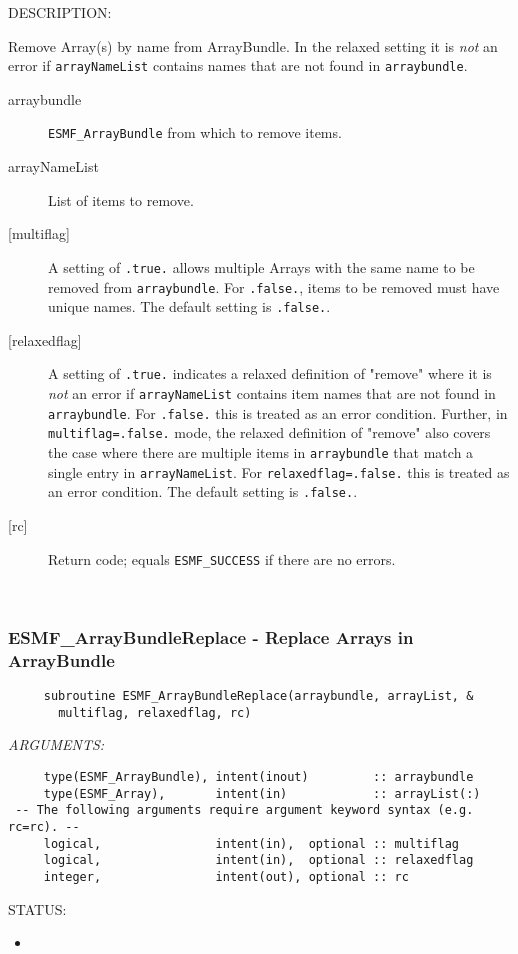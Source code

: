 {\sf DESCRIPTION:\\ }


     Remove Array(s) by name from ArrayBundle. In the relaxed setting it is 
     {\em not} an error if {\tt arrayNameList} contains names that are not 
     found in {\tt arraybundle}.
  
     \begin{description}
     \item [arraybundle]
       {\tt ESMF\_ArrayBundle} from which to remove items.
     \item [arrayNameList]
       List of items to remove.
     \item [{[multiflag]}]
       A setting of {\tt .true.} allows multiple Arrays with the same name
       to be removed from {\tt arraybundle}. For {\tt .false.}, items to be
       removed must have unique names. The default setting is {\tt .false.}.
     \item [{[relaxedflag]}]
       A setting of {\tt .true.} indicates a relaxed definition of "remove"
       where it is {\em not} an error if {\tt arrayNameList} contains item
       names that are not found in {\tt arraybundle}. For {\tt .false.} this is 
       treated as an error condition. 
       Further, in {\tt multiflag=.false.} mode, the relaxed definition of
       "remove" also covers the case where there are multiple items in
       {\tt arraybundle} that match a single entry in {\tt arrayNameList}.
       For {\tt relaxedflag=.false.} this is treated as an error condition.
       The default setting is {\tt .false.}.
     \item [{[rc]}]
       Return code; equals {\tt ESMF\_SUCCESS} if there are no errors.
     \end{description}
   
 
\mbox{}\hrulefill\ 
 
\subsubsection [ESMF\_ArrayBundleReplace] {ESMF\_ArrayBundleReplace - Replace Arrays in ArrayBundle}


  
\begin{verbatim}     subroutine ESMF_ArrayBundleReplace(arraybundle, arrayList, &
       multiflag, relaxedflag, rc)\end{verbatim}{\em ARGUMENTS:}
\begin{verbatim}     type(ESMF_ArrayBundle), intent(inout)         :: arraybundle
     type(ESMF_Array),       intent(in)            :: arrayList(:)
 -- The following arguments require argument keyword syntax (e.g. rc=rc). --
     logical,                intent(in),  optional :: multiflag
     logical,                intent(in),  optional :: relaxedflag
     integer,                intent(out), optional :: rc\end{verbatim}
{\sf STATUS:}
   \begin{itemize}
   \item{}
   \end{itemize}
  
